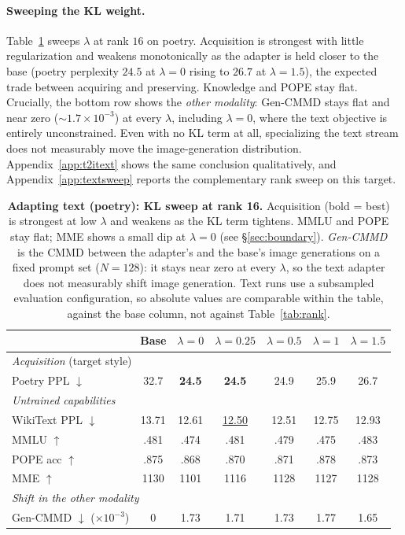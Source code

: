 \documentclass{article}
\begin{document}
\paragraph{Sweeping the KL weight.}
Table~\ref{tab:textkl} sweeps $\lambda$ at rank $16$ on poetry. Acquisition is
strongest with little regularization and weakens monotonically as the adapter is
held closer to the base (poetry perplexity $24.5$ at $\lambda=0$ rising to
$26.7$ at $\lambda=1.5$), the expected trade between acquiring and preserving.
Knowledge and POPE stay flat. Crucially, the bottom row shows the \emph{other
modality}: Gen-CMMD stays flat and near zero ($\sim\!1.7\times10^{-3}$) at every
$\lambda$, including $\lambda=0$, where the text objective is entirely
unconstrained. Even with no KL term at all, specializing the text stream does not
measurably move the image-generation distribution. Appendix~\ref{app:t2itext}
shows the same conclusion qualitatively, and Appendix~\ref{app:textsweep} reports
the complementary rank sweep on this target.

\begin{table}[t]
\caption{\textbf{Adapting text (poetry): KL sweep at rank 16.} Acquisition (bold
= best) is strongest at low $\lambda$ and weakens as the KL term tightens. MMLU
and POPE stay flat; MME shows a small dip at $\lambda=0$ (see
\S\ref{sec:boundary}). \emph{Gen-CMMD} is the CMMD between the adapter's and the
base's image generations on a fixed prompt set ($N{=}128$): it stays near zero at
every $\lambda$, so the text adapter does not measurably shift image generation.
Text runs use a subsampled evaluation configuration, so absolute values are
comparable within the table, against the base column, not against
Table~\ref{tab:rank}.}
\label{tab:textkl}
\centering\small
\begin{tabular}{lcccccc}
\toprule
& Base & $\lambda{=}0$ & $\lambda{=}0.25$ & $\lambda{=}0.5$ & $\lambda{=}1$ & $\lambda{=}1.5$ \\
\midrule
\multicolumn{7}{l}{\emph{Acquisition} (target style)}\\
Poetry PPL $\downarrow$ & 32.7 & \textbf{24.5} & \textbf{24.5} & 24.9 & 25.9 & 26.7 \\
\midrule
\multicolumn{7}{l}{\emph{Untrained capabilities}}\\
WikiText PPL $\downarrow$ & 13.71 & 12.61 & \underline{12.50} & 12.51 & 12.75 & 12.93 \\
MMLU $\uparrow$           & .481 & .474 & .481 & .479 & .475 & .483 \\
POPE acc $\uparrow$       & .875 & .868 & .870 & .871 & .878 & .873 \\
MME $\uparrow$            & 1130 & 1101 & 1116 & 1128 & 1127 & 1128 \\
\midrule
\multicolumn{7}{l}{\emph{Shift in the other modality}}\\
Gen-CMMD $\downarrow$ ($\times10^{-3}$) & 0 & 1.73 & 1.71 & 1.73 & 1.77 & 1.65 \\
\bottomrule
\end{tabular}
\end{table}
\end{document}
